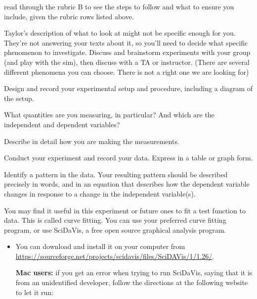 \begin{steps}
	\item read through the rubric B to see the steps to follow and what to ensure you include, given the rubric rows listed above.
	
	\item Taylor's description of what to look at might not be specific enough for you. They're not answering your texts about it, so you'll need to decide what specific phenomenon to investigate. Discuss and brainstorm experiments with your group (and play with the sim), then discuss with a TA or instructor. (There are several different phenomena you can choose. There is not a right one we are looking for)
	
	\item Design and record your experimental setup and procedure, including a diagram of the setup.
	
	\item What quantities are you measuring, in particular? And which are the independent and dependent variables?
	
	\item Describe in detail how you are making the measurements.
	
	\item Conduct your experiment and record your data. Express in a table or graph form.
	
	\item Identify a pattern in the data. Your resulting pattern should be described precisely in words, and in an equation that describes how the dependent variable changes in response to a change in the independent variable(s).
	
	\item You may find it useful in this experiment or future ones to fit a test function to data. This is called curve fitting. You can use your preferred curve fitting program, or use SciDaVis, a free open source graphical analysis program.
	
	\begin{itemize}
		\item You can download and install it on your computer from \url{https://sourceforge.net/projects/scidavis/files/SciDAVis/1/1.26/}.
		
		\begin{framed}
			\textbf{Mac users:} if you get an error when trying to run SciDaVis, saying that it is from an unidentified developer, follow the directions at the following website to let it run:
			

\end{framed}
\end{itemize}
\end{steps}
